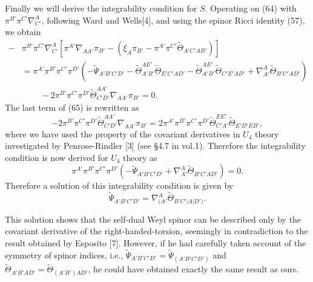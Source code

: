 \documentclass[a4paper,12pt]{article}
\begin{document}
Finally we will derive the integrability condition for $S$.
Operating on (64) with $\pi^{B'}\pi^{C'}\nabla_{C'}^A$, following Ward and Wells[4], and using the spinor Ricci identity (57), we obtain
\begin{equation}
\begin{split}
-&\pi^{B'}\pi^{C'}\nabla^A_{C'}[\pi^{A'}\nabla_{AA'}\pi_{B'}-(\xi_A\pi_{B'}-\pi^{A'}\pi^{C'}\tilde\Theta_{A'C'AB'})]\\ 
&=\pi^{A'}\pi^{B'}\pi^{C'}\pi^{D'}(-\tilde\Psi_{A'B'C'D'}
-\tilde\Theta_{A'B'}^{AE'}\tilde\Theta_{E'C'AD'}-\tilde\Theta_{A'B'}^{AE'}\tilde\Theta_{C'E'AD'}
+\nabla^A_{A'}\tilde\Theta_{B'C'AD'})\\ 
&\ \ \ \ \ \ \ \ \ \ -2\pi^{B'}\pi^{C'}\pi^{D'}\tilde\Theta_{C'D'}^{AA'}\nabla_{AA'}\pi_{B'}=0.
\end{split}
\end{equation}
The last term of (65) is rewritten as
\begin{equation}
-2\pi^{B'}\pi^{C'}\pi^{D'}\tilde\Theta_{C'D'}^{AA'}\nabla_{AA'}\pi_{B'}
=2\pi^{A'}\pi^{B'}\pi^{C'}\pi^{D'}\tilde\Theta_{C'A'}^{EE'}\tilde\Theta_{E'D'EB'},
\end{equation}
where we have used the property of the covariant derivatives in $U_4$ theory investigated by Penrose-Rindler [3] (see \S 4.7 in vol.1).
Therefore the integrability condition is now derived for $U_4$ theory as
\begin{equation}
\pi^{A'}\pi^{B'}\pi^{C'}\pi^{D'}(-\tilde\Psi_{A'B'C'D'}+\nabla^A_{A'}\tilde\Theta_{B'C'AD'})=0.
\end{equation}
Therefore a solution of this integrability condition is given by
\begin{equation}
\tilde\Psi_{A'B'C'D'}=\nabla^A_{(A'}\tilde\Theta_{B'C'|A|D')}.
\end{equation}

This solution shows that the self-dual Weyl spinor can be described only by the covariant derivative of the right-handed-torsion, seemingly in contradiction to  the result obtained by Esposito [7]. However, if he had carefully taken account of the symmetry of spinor indices, i.e., $\tilde\Psi_{A'B'C'D'}=\tilde\Psi_{(A'B'C'D')}$ and $\tilde\Theta_{A'B'AD'}=\tilde\Theta_{(A'B')AD'}$, he could have obtained exactly the same result as ours.
 
\end{document}
